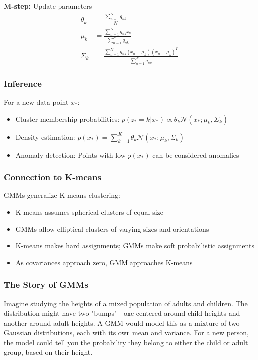 \documentclass{article}
\begin{document}
\textbf{M-step:} Update parameters
\begin{align}
    \theta_k &= \frac{\sum_{n=1}^N q_{nk}}{N} \\
    \mu_k &= \frac{\sum_{n=1}^N q_{nk}x_n}{\sum_{n=1}^N q_{nk}} \\
    \Sigma_k &= \frac{\sum_{n=1}^N q_{nk}(x_n - \mu_k)(x_n - \mu_k)^T}{\sum_{n=1}^N q_{nk}}
\end{align}

\subsubsection{Inference}
For a new data point $x_*$:
\begin{itemize}
    \item Cluster membership probabilities: $p(z_*=k|x_*) \propto \theta_k \mathcal{N}(x_*; \mu_k, \Sigma_k)$
    \item Density estimation: $p(x_*) = \sum_{k=1}^K \theta_k \mathcal{N}(x_*; \mu_k, \Sigma_k)$
    \item Anomaly detection: Points with low $p(x_*)$ can be considered anomalies
\end{itemize}

\subsubsection{Connection to K-means}
GMMs generalize K-means clustering:
\begin{itemize}
    \item K-means assumes spherical clusters of equal size
    \item GMMs allow elliptical clusters of varying sizes and orientations
    \item K-means makes hard assignments; GMMs make soft probabilistic assignments
    \item As covariances approach zero, GMM approaches K-means
\end{itemize}

\subsubsection{The Story of GMMs}
Imagine studying the heights of a mixed population of adults and children. The distribution might have two "bumps" - one centered around child heights and another around adult heights. A GMM would model this as a mixture of two Gaussian distributions, each with its own mean and variance. For a new person, the model could tell you the probability they belong to either the child or adult group, based on their height.
\end{document}
